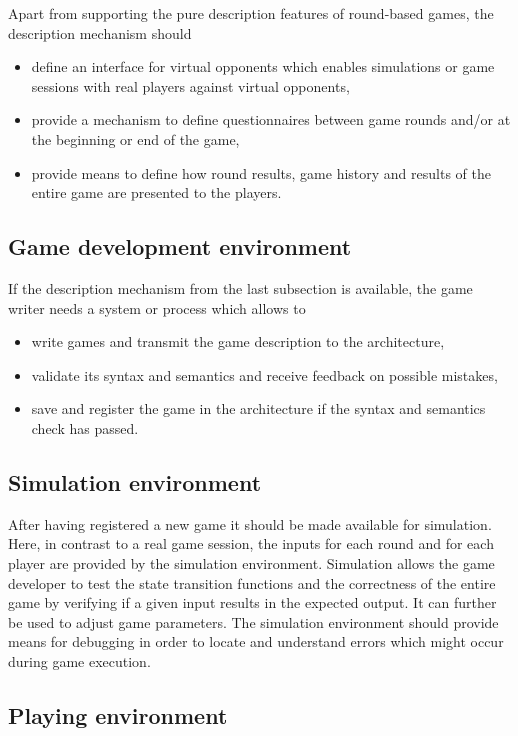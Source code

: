 Apart from supporting the pure description features of round-based games, the description mechanism should
\begin{itemize}
\item define an interface for virtual opponents which enables simulations or game sessions with real players against virtual opponents, 
\item provide a mechanism to define questionnaires between game rounds and/or at the beginning or end of the game,
\item provide means to define how round results, game history and results of the entire game are presented to the players.
\end{itemize}

\subsection{Game development environment}
\label{subsec:req:develop}

If the description mechanism from the last subsection is available, the game writer needs a system or process which allows to
\begin{itemize}
\item write games and transmit the game description to the architecture,
\item validate its syntax and semantics and receive feedback on possible mistakes,
\item save and register the game in the architecture if the syntax and semantics check has passed.
\end{itemize}

\subsection{Simulation environment}
\label{subsec:req:simulation}

After having registered a new game it should be made available for simulation. Here, in contrast to a real game session, the inputs for each round and for each player are provided by the simulation environment. Simulation allows the game developer to test the state transition functions and the correctness of the entire game by verifying if a given input results in the expected output. It can further be used to adjust game parameters. The simulation environment should provide means for debugging in order to locate and understand errors which might occur during game execution.

\subsection{Playing environment}
\label{subsec:req:play}

